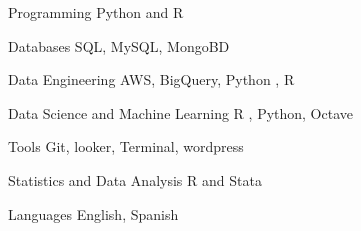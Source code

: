 

\begin{cvskills}

  \cvskill
    {Programming} %
    {Python and R} %

  \cvskill
    {Databases} %
    {SQL, MySQL, MongoBD} %

  \cvskill
    {Data Engineering} %
    {AWS, BigQuery, Python , R} %

  \cvskill
    {Data Science and Machine Learning} %
    {R , Python, Octave} %

  \cvskill
    {Tools} %
    { Git, looker, Terminal, wordpress } %

  \cvskill
    {Statistics and Data Analysis} %
    {R and Stata} %



  \cvskill
    {Languages} %
    {English, Spanish} %

\end{cvskills}